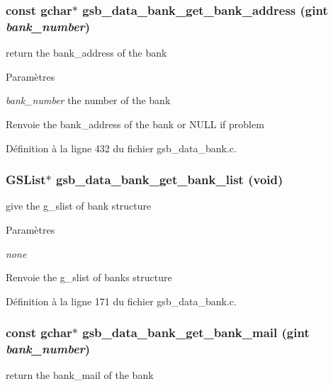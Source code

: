 \subsubsection[{gsb\_\-data\_\-bank\_\-get\_\-bank\_\-address}]{\setlength{\rightskip}{0pt plus 5cm}const gchar$\ast$ gsb\_\-data\_\-bank\_\-get\_\-bank\_\-address (gint {\em bank\_\-number})}\label{gsb__data__bank_8h_ac14e4a008f5bfd0907ce034f12a6a845}
return the bank\_\-address of the bank


\begin{DoxyParams}{Paramètres}
\item[{\em bank\_\-number}]the number of the bank\end{DoxyParams}
\begin{DoxyReturn}{Renvoie}
the bank\_\-address of the bank or NULL if problem 
\end{DoxyReturn}


Définition à la ligne 432 du fichier gsb\_\-data\_\-bank.c.

\subsubsection[{gsb\_\-data\_\-bank\_\-get\_\-bank\_\-list}]{\setlength{\rightskip}{0pt plus 5cm}GSList$\ast$ gsb\_\-data\_\-bank\_\-get\_\-bank\_\-list (void)}\label{gsb__data__bank_8h_a0e4a0af8810f138e45e0965d99f17f31}
give the g\_\-slist of bank structure


\begin{DoxyParams}{Paramètres}
\item[{\em none}]\end{DoxyParams}
\begin{DoxyReturn}{Renvoie}
the g\_\-slist of banks structure 
\end{DoxyReturn}


Définition à la ligne 171 du fichier gsb\_\-data\_\-bank.c.

\subsubsection[{gsb\_\-data\_\-bank\_\-get\_\-bank\_\-mail}]{\setlength{\rightskip}{0pt plus 5cm}const gchar$\ast$ gsb\_\-data\_\-bank\_\-get\_\-bank\_\-mail (gint {\em bank\_\-number})}\label{gsb__data__bank_8h_a81d9d84a24978b647f915e9b927b5a1c}
return the bank\_\-mail of the bank


